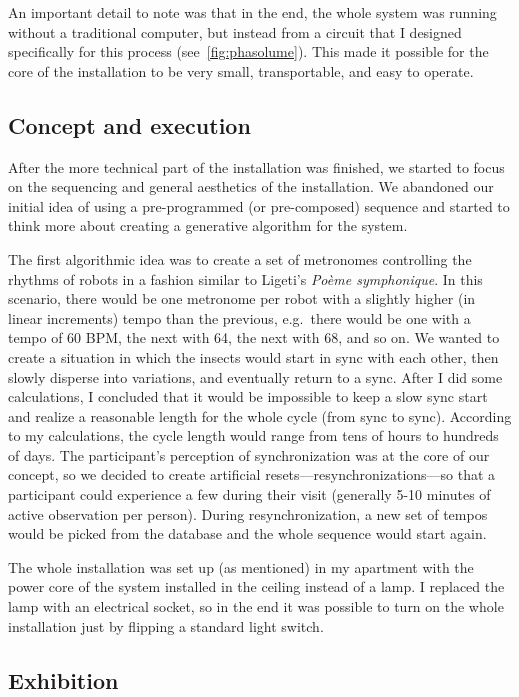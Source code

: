 \documentclass[12pt,a4paper,oneside]{report}
\begin{document}
An important detail to note was that in the end, the whole system was running without a traditional computer, but instead from a circuit that I designed specifically for this process (see~\ref{fig:phasolume}). This made it possible for the core of the installation to be very small, transportable, and easy to operate.

\subsection{Concept and execution}

After the more technical part of the installation was finished, we started to focus on the sequencing and general aesthetics of the installation.  We abandoned our initial idea of using a pre-programmed (or pre-composed) sequence and started to think more about creating a generative algorithm for the system.

The first algorithmic idea was to create a set of metronomes controlling the rhythms of robots in a fashion similar to Ligeti’s \emph{Poème symphonique}. In this scenario, there would be one metronome per robot with a slightly higher (in linear increments) tempo than the previous, e.g.\ there would be one with a tempo of 60 BPM, the next with 64, the next with 68, and so on. We wanted to create a situation in which the insects would start in sync with each other, then slowly disperse into variations, and eventually return to a sync. After I did some calculations, I concluded that it would be impossible to keep a slow sync start and realize a reasonable length for the whole cycle (from sync to sync). According to my calculations, the cycle length would range from tens of hours to hundreds of days. The participant’s perception of synchronization was at the core of our concept, so we decided to create artificial resets---resynchronizations---so that a participant could experience a few during their visit (generally 5-10 minutes of active observation per person). During resynchronization, a new set of tempos would be picked from the database and the whole sequence would start again.

The whole installation was set up (as mentioned) in my apartment with the power core of the system installed in the ceiling instead of a lamp. I replaced the lamp with an electrical socket, so in the end it was possible to turn on the whole installation just by flipping a standard light switch.

\subsection{Exhibition}
\end{document}
